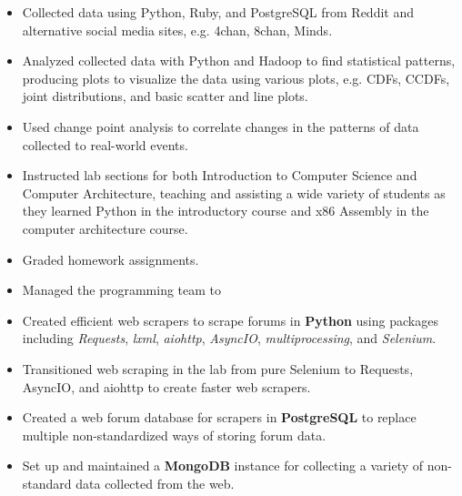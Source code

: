 \documentclass[10pt]{setzer_resume}
\begin{document}
  \begin{itemize}[nosep]%
    \item Collected data using Python, Ruby, and PostgreSQL from Reddit and alternative social media sites, e.g. 4chan, 8chan, Minds.
    \item Analyzed collected data with Python and Hadoop to find statistical patterns, producing plots to visualize the data using various plots, e.g. CDFs, CCDFs, joint distributions, and basic scatter and line plots.
    \item Used change point analysis to correlate changes in the patterns of data collected to real-world events.
  \end{itemize}


  \begin{itemize}[nosep]
    \item Instructed lab sections for both Introduction to Computer Science and Computer Architecture, teaching and assisting a wide variety of students as they learned Python in the introductory course and x86 Assembly in the computer architecture course.
    \item Graded homework assignments.
  \end{itemize}


  \begin{itemize}[nosep]%

    \item Managed the programming team to 
    \item Created efficient web scrapers to scrape forums in \textbf{Python} using packages including \textit{Requests}, \textit{lxml}, \textit{aiohttp}, \textit{AsyncIO}, \textit{multiprocessing}, and \textit{Selenium}.
    \item Transitioned web scraping in the lab from pure Selenium to Requests, AsyncIO, and aiohttp to create faster web scrapers.
    \item Created a web forum database for scrapers in \textbf{PostgreSQL} to replace multiple non-standardized ways of storing forum data.
    \item Set up and maintained a \textbf{MongoDB} instance for collecting a variety of non-standard data collected from the web.
          
  \end{itemize}
\end{document}
